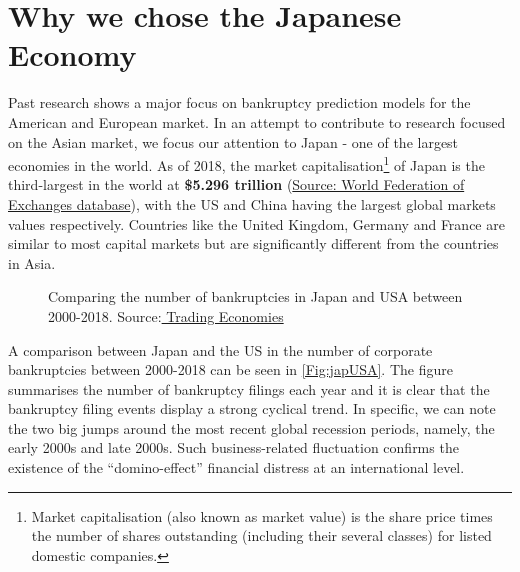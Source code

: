 \label{chap:JapanDataset}

\section{Why we chose the Japanese Economy}

Past research shows a major focus on bankruptcy prediction models for the American and European market.
In an attempt to contribute to research focused on the Asian market, we focus our attention to Japan - one of the largest economies in the world. As of 2018, the market capitalisation\footnote{Market capitalisation (also known as market value) is the share price times the number of shares outstanding (including their several classes) for listed domestic companies.} of Japan is the third-largest in the world at \textbf{\$5.296 trillion} (\href{https://www.world-exchanges.org/our-work/statistics}{Source: World Federation of Exchanges database}), with the US and China having the largest global markets values respectively. Countries like the United Kingdom, Germany and France are similar to most capital markets but are significantly different from the countries in Asia.

\begin{figure}[htpb]
\centering
{}
\caption{Comparing the number of bankruptcies in Japan and USA between 2000-2018. Source:\href{https://tradingeconomics.com/japan/bankruptcies}{ Trading Economies} }
\label{Fig:japUSA}
\end{figure}

A comparison between Japan and the US in the number of corporate bankruptcies between 2000-2018 can be seen in \autoref{Fig:japUSA}. The figure summarises the number of bankruptcy filings each year and it is clear that the bankruptcy filing events display a strong cyclical trend. In specific, we can note the two big jumps around the most recent global recession periods, namely, the early 2000s and late 2000s. Such business-related fluctuation confirms the existence of the “domino-effect” financial distress at an international level.

